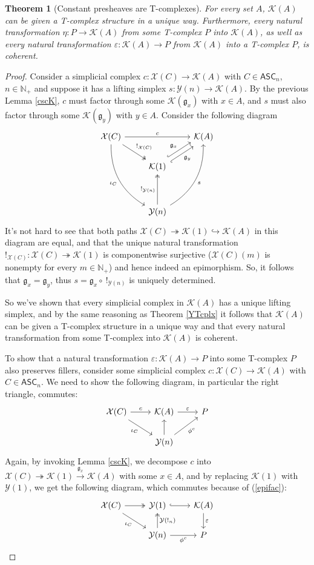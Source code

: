 \documentclass{article}
\newtheorem{theorem}{Theorem}[subsection]
\theoremstyle{remark}
\theoremstyle{definition}
\newcommand{\N}{\mathbb N}
\newcommand{\ASC}{\mathsf{ASC}}
\newcommand{\Y}{\mathcal Y}
\newcommand{\X}{\mathcal X}
\newcommand{\K}{\mathcal K}
\newcommand{\g}{\mathfrak g}
\begin{document}
	\begin{theorem}[Constant presheaves are T-complexes]\label{TcplxK}
		For every set $A$, $\K(A)$ can be given a T-complex structure in a unique way. Furthermore, every natural transformation $\eta:P\to\K(A)$ from some T-complex $P$ into $\K(A)$, as well as every natural transformation $\varepsilon:\K(A)\to P$ from $\K(A)$ into a T-complex $P$, is coherent.
	\end{theorem}
	\begin{proof}
		Consider a simplicial complex $c:\X(C)\to\K(A)$ with $C\in\ASC_n$, $n\in\N_+$ and suppose it has a lifting simplex $s:\Y(n)\to\K(A)$. By the previous Lemma \ref{cscK}, $c$ must factor through some $\K(\g_x)$ with $x\in A$, and $s$ must also factor through some $\K(\g_y)$ with $y\in A$. Consider the following diagram
		\[\begin{tikzcd}
			\X(C)\arrow{rr}{c}\arrow[two heads]{dr}{!_{\X(C)}}\arrow[bend right=30]{dddr}[swap]{\iota_C}&&\K(A)\\
			&\K(1)\arrow[hook,shift left=1mm]{ur}{\g_x}\arrow[hook',shift right=1mm]{ur}[swap]{\g_y}\\\\
			&\Y(n)\arrow[two heads]{uu}{!_{\Y(n)}}\arrow[bend right=30]{uuur}[swap]{s}
		\end{tikzcd}\]
		It's not hard to see that both paths $\X(C)\twoheadrightarrow\K(1)\hookrightarrow\K(A)$ in this diagram are equal, and that the unique natural transformation $!_{\X(C)}:\X(C)\twoheadrightarrow\K(1)$ is componentwise surjective ($\X(C)(m)$ is nonempty for every $m\in\N_+$) and hence indeed an epimorphism. So, it follows that $\g_x=\g_y$, thus $s=\g_x\circ\ !_{\Y(n)}$ is uniquely determined.
		
		So we've shown that every simplicial complex in $\K(A)$ has a unique lifting simplex, and by the same reasoning as Theorem \ref{YTcplx} it follows that $\K(A)$ can be given a T-complex structure in a unique way and that every natural transformation from some T-complex into $\K(A)$ is coherent.
		
		To show that a natural transformation $\varepsilon:\K(A)\to P$ into some T-complex $P$ also preserves fillers, consider some simplicial complex $c:\X(C)\to\K(A)$ with $C\in\ASC_n$. We need to show the following diagram, in particular the right triangle, commutes:
		\[\begin{tikzcd}
			\X(C)\arrow{r}{c}\arrow{dr}[swap]{\iota_C}&\K(A)\arrow{r}{\varepsilon}&P\\
			&\Y(n)\arrow{u}\arrow{ur}[swap]{\phi^c}
		\end{tikzcd}\]
		Again, by invoking Lemma \ref{cscK}, we decompose $c$ into $\X(C)\twoheadrightarrow\K(1)\xrightarrow{\g_x}\K(A)$ with some $x\in A$, and by replacing $\K(1)$ with $\Y(1)$, we get the following diagram, which commutes because of (\ref{epifac}):
		\[\begin{tikzcd}
			\X(C)\arrow[two heads]{r}\arrow{dr}[swap]{\iota_C}&\Y(1)\arrow[hook]{r}&\K(A)\arrow{d}{\varepsilon}\\
			&\Y(n)\arrow[two heads]{u}[swap]{\Y(!_n)}\arrow{r}[swap]{\phi^c}&P
		\end{tikzcd}\]
	\end{proof}
\end{document}
